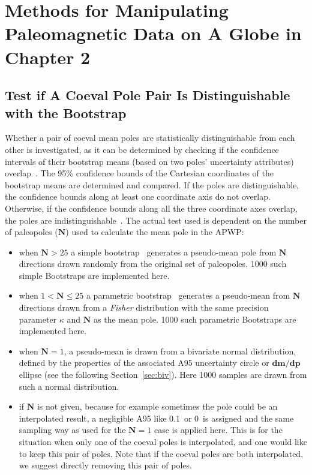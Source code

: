 \chapter{Methods for Manipulating Paleomagnetic Data on A Globe in Chapter
2}\label{appen4chp2}

\section{Test if A Coeval Pole Pair Is Distinguishable with the Bootstrap}
Whether a pair of coeval mean poles are statistically distinguishable from each
other is investigated, as it can be determined by checking if the confidence
intervals of their bootstrap means (based on two poles' uncertainty attributes)
overlap~\citep{T91}. The 95\% confidence bounds of the Cartesian coordinates of
the bootstrap means are determined and compared. If the poles are
distinguishable, the confidence bounds along at least one coordinate axis do not
overlap. Otherwise, if the confidence bounds along all the three coordinate axes
overlap, the poles are indistinguishable~\citep{T91}. The actual test used is
dependent on the number of paleopoles ($\mathbf{N}$) used to calculate the mean
pole in the APWP$\colon$

\begin{itemize}
  \item when $\mathbf{N}>25$ a simple bootstrap~\citep{T91} generates a
    pseudo-mean pole from $\mathbf{N}$ directions drawn randomly from the
    original set of paleopoles. 1000 such simple Bootstraps are implemented here.
  \item when $1<\mathbf{N}\leq25$ a parametric bootstrap~\citep{T91} generates a
    pseudo-mean from $\mathbf{N}$ directions drawn from a \emph{Fisher}
    distribution with the same precision parameter $\kappa$ and $\mathbf{N}$ as
    the mean pole. 1000 such parametric Bootstraps are implemented here.
  \item when $\mathbf{N}=1$, a pseudo-mean is drawn from a bivariate normal
    distribution, defined by the properties of the associated A95 uncertainty
    circle or $\mathbf{dm}/\mathbf{dp}$ ellipse (see the following
    Section~\ref{sec:biv}). Here 1000 samples are drawn from such a normal
    distribution.
  \item if $\mathbf{N}$ is not given, because for example sometimes the pole
    could be an interpolated result, a negligible A95 like 0.1\degree\ or
    0\degree\ is assigned and the same sampling way as used for the
    $\mathbf{N}=1$ case is applied here. This is for the situation when only one
    of the coeval poles is interpolated, and one would like to keep this pair of
    poles. Note that if the coeval poles are both interpolated, we suggest
    directly removing this pair of poles.
\end{itemize}

